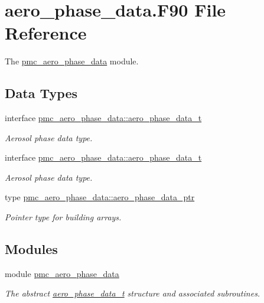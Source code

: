 \hypertarget{aero__phase__data_8_f90}{}\section{aero\+\_\+phase\+\_\+data.\+F90 File Reference}
\label{aero__phase__data_8_f90}


The \mbox{\hyperlink{namespacepmc__aero__phase__data}{pmc\+\_\+aero\+\_\+phase\+\_\+data}} module.  


\subsection*{Data Types}
\begin{DoxyCompactItemize}
\item 
interface \mbox{\hyperlink{structpmc__aero__phase__data_1_1aero__phase__data__t}{pmc\+\_\+aero\+\_\+phase\+\_\+data\+::aero\+\_\+phase\+\_\+data\+\_\+t}}
\begin{DoxyCompactList}\small\item\em Aerosol phase data type. \end{DoxyCompactList}\item 
interface \mbox{\hyperlink{structpmc__aero__phase__data_1_1aero__phase__data__t}{pmc\+\_\+aero\+\_\+phase\+\_\+data\+::aero\+\_\+phase\+\_\+data\+\_\+t}}
\begin{DoxyCompactList}\small\item\em Aerosol phase data type. \end{DoxyCompactList}\item 
type \mbox{\hyperlink{structpmc__aero__phase__data_1_1aero__phase__data__ptr}{pmc\+\_\+aero\+\_\+phase\+\_\+data\+::aero\+\_\+phase\+\_\+data\+\_\+ptr}}
\begin{DoxyCompactList}\small\item\em Pointer type for building arrays. \end{DoxyCompactList}\end{DoxyCompactItemize}
\subsection*{Modules}
\begin{DoxyCompactItemize}
\item 
module \mbox{\hyperlink{namespacepmc__aero__phase__data}{pmc\+\_\+aero\+\_\+phase\+\_\+data}}
\begin{DoxyCompactList}\small\item\em The abstract \mbox{\hyperlink{structpmc__aero__phase__data_1_1aero__phase__data__t}{aero\+\_\+phase\+\_\+data\+\_\+t}} structure and associated subroutines. \end{DoxyCompactList}\end{DoxyCompactItemize}
